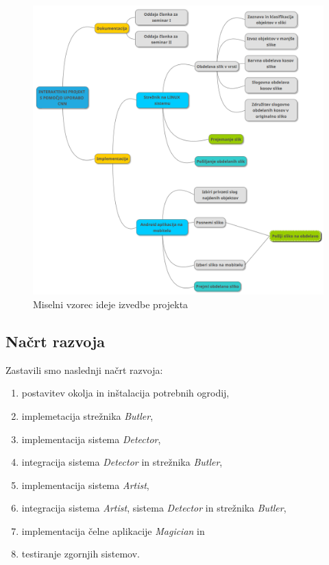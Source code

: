 \documentclass[runningheads,a4paper]{llncs}
\begin{document}
\begin{figure}[H]
\centering
\includegraphics[width=150mm, center]{figures/mind_map.png}
\caption{Miselni vzorec ideje izvedbe projekta}
\label{fig:mind_map}
\end{figure}

\pagebreak

\subsection{Načrt razvoja}

Zastavili smo naslednji načrt razvoja:
\begin{enumerate}
\item postavitev okolja in inštalacija potrebnih ogrodij,
\item implemetacija strežnika \textit{Butler},
\item implementacija sistema \textit{Detector},
\item integracija sistema \textit{Detector} in strežnika \textit{Butler},
\item implementacija sistema \textit{Artist},
\item integracija sistema \textit{Artist}, sistema \textit{Detector} in strežnika \textit{Butler},
\item implementacija čelne aplikacije \textit{Magician} in
\item testiranje zgornjih sistemov.
\end{enumerate}
\end{document}
